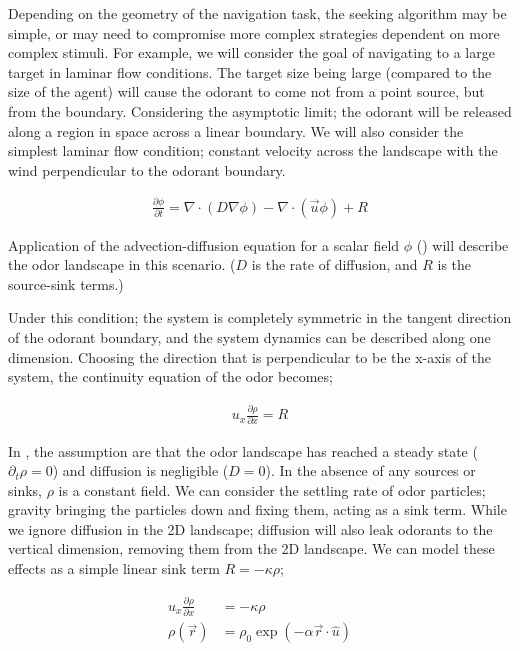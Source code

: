 \documentclass[../dissertation.tex]{subfiles}
\begin{document}
Depending on the geometry of the navigation task, the seeking algorithm may be simple, or may need to compromise more complex strategies dependent on more complex stimuli.
For example, we will consider the goal of navigating to a large target in laminar flow conditions.
The target size being large (compared to the size of the agent) will cause the odorant to come not from a point source, but from the boundary.
Considering the asymptotic limit; the odorant will be released along a region in space across a linear boundary.
We will also consider the simplest laminar flow condition; constant velocity across the landscape with the wind perpendicular to the odorant boundary.

\begin{align} \label{eqn:advectiondiffusion}
    \frac{\partial \phi}{\partial t} = \nabla \cdot \left( D \nabla \phi \right) - \nabla \cdot \left( \vec{u} \phi \right) + R
\end{align}

Application of the advection-diffusion equation for a scalar field $\phi$ () will describe the odor landscape in this scenario.
($D$ is the rate of diffusion, and $R$ is the source-sink terms.)

Under this condition; the system is completely symmetric in the tangent direction of the odorant boundary, and the system dynamics can be described along one dimension.
Choosing the direction that is perpendicular to be the x-axis of the system, the continuity equation of the odor becomes;

\begin{align} \label{eqn:continuity}
    u_{x} \frac{\partial \rho}{\partial x} = R
\end{align}

In , the assumption are that the odor landscape has reached a steady state ($\partial_t \rho = 0$) and diffusion is negligible ($D=0$).
In the absence of any sources or sinks, $\rho$ is a constant field.
We can consider the settling rate of odor particles; gravity bringing the particles down and fixing them, acting as a sink term.
While we ignore diffusion in the 2D landscape; diffusion will also leak odorants to the vertical dimension, removing them from the 2D landscape.
We can model these effects as a simple linear sink term $R=-\kappa\rho$;

\begin{equation} \begin{aligned} \label{eqn:1dplume}
    u_{x} \frac{ \partial \rho }{ \partial x } &= - \kappa \rho \\
    \rho \left( \vec{r} \right) &= \rho_{0} \exp( - \alpha \vec{r} \cdot \hat{u})
\end{aligned} \end{equation}
\end{document}
